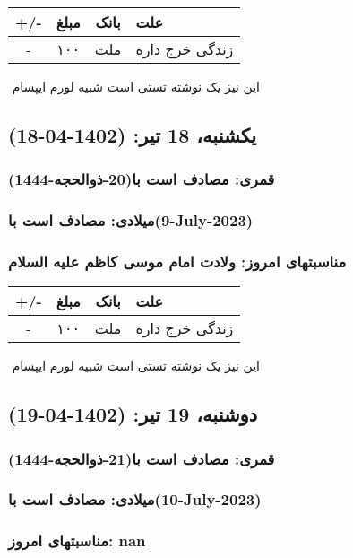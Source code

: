 \documentclass{article}
\newcommand{\rnote}[1]{\marginpar{\textcolor{color}{\StrSubstitute{\##1}{ }{\_}}}}
\newcommand{\myRow}[4]{
    #1 & #2 & #3 & #4 \\ \hline
}
\begin{document}
\begin{tabular}{ | c | c | c | p{5cm} |}
    \hline
    \myRow{ +/- }{مبلغ}{بانک}{علت}
    \myRow{-}{۱۰۰}{ملت}{زندگی خرج داره}
\end{tabular}
\newline
\newline

‌
\rnote{تست}
این نیز یک نوشته تستی است شبیه لورم ایپسام




\newpage
{}
\textcolor{color}{
\section{ یکشنبه، 18 تیر: (1402-04-18) }
\subsubsection*{قمری: مصادف است با(20-ذوالحجه-1444)} 
\subsubsection*{میلادی: مصادف است با(9-July-2023)}
\subsubsection*{مناسبتهای امروز: ولادت امام موسی کاظم علیه السلام}
}


\begin{tabular}{ | c | c | c | p{5cm} |}
    \hline
    \myRow{ +/- }{مبلغ}{بانک}{علت}
    \myRow{-}{۱۰۰}{ملت}{زندگی خرج داره}
\end{tabular}
\newline
\newline

‌
\rnote{تست}
این نیز یک نوشته تستی است شبیه لورم ایپسام




\newpage
{}
\textcolor{color}{
\section{ دوشنبه، 19 تیر: (1402-04-19) }
\subsubsection*{قمری: مصادف است با(21-ذوالحجه-1444)} 
\subsubsection*{میلادی: مصادف است با(10-July-2023)}
\subsubsection*{مناسبتهای امروز: nan}
}
\end{document}
